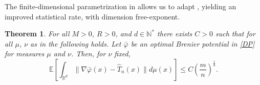 \documentclass[11pt]{article}
\newtheorem{theorem}[lemma]{Theorem}
\newcommand{\R}{\mathbb R}
\newcommand{\1}{\mathbbm{1}}
\numberwithin{equation}{section}
\begin{document}
The finite-dimensional parametrization in  allows us to adapt , yielding an improved statistical rate, with dimension free-exponent.
\begin{theorem}
	\label{th:mainResultSemiDiscrete}
	For all $M>0$, $R>0$, and $d\in \mathbb{N}^*$ there exists $C>0$ such that for all $\mu$, $\nu$ as in  the following holds. Let $\bar{\varphi}$ be an optimal Brenier potential in \eqref{DP} for measures $\mu$ and $\nu$. Then, for $\nu$ fixed,
    \begin{equation*}
        \mathbb{E}\left[ \int_{\R^d}\|\nabla \bar{\varphi}(x)-\hat{T}_n(x)\|d\mu(x)\right]\leq C\left( \frac{m}{n}\right)^{\frac{1}{8}}.
    \end{equation*}
\end{theorem}
\end{document}

